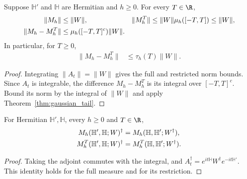 \begin{theorem}
    \label{thm:gaussian_filter_contraction}
    \leanok
    Suppose $\mathbb H'$ and $\mathbb H$ are Hermitian and $h\ge0$.
    For every $T\in\R$,
    \begin{align}
        \|M_h\|&\le\|W\|, &
        \|M_h^T\|&\le\|W\|\mu_h([-T,T])\le\|W\|,
        \label{eq:gaussian_contractions}\\
        \|M_h-M_h^T\|&\le\mu_h([-T,T]^c)\|W\|. \notag
    \end{align}
    In particular, for $T\ge0$,
    \begin{align}
        \|M_h-M_h^T\|&\le\tau_h(T)\|W\|.
        \label{eq:gaussian_truncation_error}
    \end{align}
\end{theorem}
\begin{proof}\leanok
    Integrating $\|A_t\|=\|W\|$ gives the full and restricted norm
    bounds. Since $A_t$ is integrable, the difference $M_h-M_h^T$ is
    its integral over $[-T,T]^c$. Bound its norm by the integral of
    $\|W\|$ and apply Theorem~\ref{thm:gaussian_tail}.
\end{proof}

\begin{theorem}
    \label{thm:gaussian_filter_adjoint}
    \leanok
    For Hermitian $\mathbb H',\mathbb H$, every $h\ge0$ and $T\in\R$,
    \begin{align}
        M_h(\mathbb H',\mathbb H;W)^\dagger
            &=M_h(\mathbb H,\mathbb H';W^\dagger),
        \label{eq:gaussian_adjoint}\\
        M_h^T(\mathbb H',\mathbb H;W)^\dagger
            &=M_h^T(\mathbb H,\mathbb H';W^\dagger). \notag
    \end{align}
\end{theorem}
\begin{proof}\leanok
    Taking the adjoint commutes with the integral, and
    $A_t^\dagger=e^{it\mathbb H}W^\dagger e^{-it\mathbb H'}$.
    This identity holds for the full measure and for its restriction.
\end{proof}

